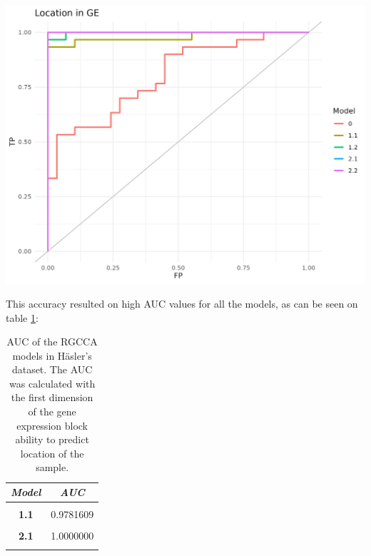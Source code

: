 \documentclass[
  12pt,
  a4paper,
  twoside,
  openright]{book}
\let\origfigure\figure
\let\endorigfigure\endfigure
\renewenvironment{figure}[1][2] {
    \expandafter\origfigure\expandafter[!htp]
} {
    \endorigfigure
}
\begin{document}
\begin{figure}
\includegraphics[width=1\linewidth]{images/hasler-auc} \caption[AUC of RGCCA models in the Häsler's dataset]{AUC of models with RGCCA in the Häsler's dataset. The classification of the localization of the sample according to the first component of the gene expression of the models generated with RGCCA on the Häsler's dataset.}\label{fig:hasler-auc-plot}
\end{figure}

This accuracy resulted on high AUC values for all the models, as can be seen on table \ref{tab:hasler-auc}:

\begin{table}[H]

\caption[AUC of the RGCCA models in Häsler's dataset.]{\label{tab:hasler-auc}AUC of the RGCCA models in Häsler's dataset. The AUC was calculated with the first dimension of the gene expression block ability to predict location of the sample.}
\centering
\begin{tabular}[t]{|>{}c|>{}c|}
\hline
\em{\textbf{Model}} & \em{\textbf{AUC}}\\
\hline
\textbf{\cellcolor{gray!6}{0}} & \cellcolor{gray!6}{0.8011494}\\
\hline
\textbf{1.1} & 0.9781609\\
\hline
\textbf{\cellcolor{gray!6}{1.2}} & \cellcolor{gray!6}{0.9977011}\\
\hline
\textbf{2.1} & 1.0000000\\
\hline
\textbf{\cellcolor{gray!6}{2.2}} & \cellcolor{gray!6}{1.0000000}\\
\hline
\end{tabular}
\end{table}
\end{document}
